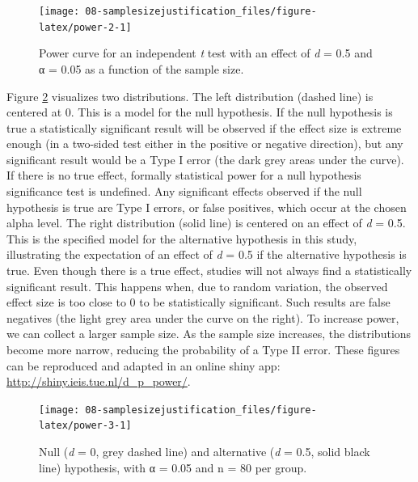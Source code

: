 \documentclass[
  oneside]{book}
\begin{document}
\begin{figure}

{\centering \texttt{[image: 08-samplesizejustification\_files/figure-latex/power-2-1]} 

}

\caption{Power curve for an independent \emph{t} test with an effect of \emph{d} = 0.5 and α = 0.05 as a function of the sample size.}\label{fig:power-2}
\end{figure}

Figure \ref{fig:power-3} visualizes two distributions. The left distribution (dashed line) is centered at 0. This is a model for the null hypothesis. If the null hypothesis is true a statistically significant result will be observed if the effect size is extreme enough (in a two-sided test either in the positive or negative direction), but any significant result would be a Type I error (the dark grey areas under the curve). If there is no true effect, formally statistical power for a null hypothesis significance test is undefined. Any significant effects observed if the null hypothesis is true are Type I errors, or false positives, which occur at the chosen alpha level. The right distribution (solid line) is centered on an effect of \emph{d} = 0.5. This is the specified model for the alternative hypothesis in this study, illustrating the expectation of an effect of \emph{d} = 0.5 if the alternative hypothesis is true. Even though there is a true effect, studies will not always find a statistically significant result. This happens when, due to random variation, the observed effect size is too close to 0 to be statistically significant. Such results are false negatives (the light grey area under the curve on the right). To increase power, we can collect a larger sample size. As the sample size increases, the distributions become more narrow, reducing the probability of a Type II error. These figures can be reproduced and adapted in an online shiny app: \url{http://shiny.ieis.tue.nl/d_p_power/}.



\begin{figure}

{\centering \texttt{[image: 08-samplesizejustification\_files/figure-latex/power-3-1]} 

}

\caption{Null (\emph{d} = 0, grey dashed line) and alternative (\emph{d} = 0.5, solid black line) hypothesis, with α = 0.05 and n = 80 per group.}\label{fig:power-3}
\end{figure}
\end{document}
